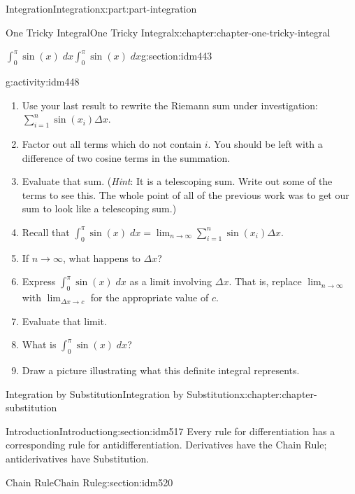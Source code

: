 \documentclass[oneside,10pt,]{book}
\numberwithin{equation}{section}
\begin{document}
\begin{partptx}{Integration}{}{Integration}{}{}{x:part:part-integration}
\begin{chapterptx}{One Tricky Integral}{}{One Tricky Integral}{}{}{x:chapter:chapter-one-tricky-integral}
\begin{sectionptx}{\(\displaystyle \int_0^\pi \sin(x) \; dx\)}{}{\(\displaystyle \int_0^\pi \sin(x) \; dx\)}{}{}{g:section:idm443}
\begin{activity}{}{g:activity:idm448}
\begin{enumerate}[font=\bfseries,label=(\alph*),ref=\alph*]
\item{}Use your last result to rewrite the Riemann sum under investigation: \(\displaystyle \sum_{i=1}^n \sin(x_i) \Delta x\).%
\item{}Factor out all terms which do not contain \(i\). You should be left with a difference of two cosine terms in the summation.%
\item{}Evaluate that sum. (\emph{Hint}: It is a telescoping sum. Write out some of the terms to see this. The whole point of all of the previous work was to get our sum to look like a telescoping sum.)%
\item{}Recall that \(\displaystyle \int_0^\pi \sin(x) \;dx = \lim_{n \to \infty} \sum_{i=1}^n \sin(x_i) \Delta x\).%
\item{}If \(n \to \infty\), what happens to \(\Delta x\)?%
\item{}Express \(\displaystyle \int_0^\pi \sin(x) \; dx\) as a limit involving \(\Delta x\). That is, replace \(\displaystyle \lim_{n \to \infty}\) with \(\displaystyle \lim_{\Delta x \to c}\) for the appropriate value of \(c\).%
\item{}Evaluate that limit.%
\item{}What is \(\displaystyle \int_0^\pi \sin(x) \; dx\)?%
\item{}Draw a picture illustrating what this definite integral represents.%
\end{enumerate}
\end{activity}
\end{sectionptx}
\end{chapterptx}
%
\typeout{************************************************}
\typeout{************************************************}
%
\begin{chapterptx}{Integration by Substitution}{}{Integration by Substitution}{}{}{x:chapter:chapter-substitution}
%
%
\typeout{************************************************}
\typeout{************************************************}
%
\begin{sectionptx}{Introduction}{}{Introduction}{}{}{g:section:idm517}
Every rule for differentiation has a corresponding rule for antidifferentiation. Derivatives have the Chain Rule; antiderivatives have Substitution.%
\end{sectionptx}
%
%
\typeout{************************************************}
\typeout{************************************************}
%
\begin{sectionptx}{Chain Rule}{}{Chain Rule}{}{}{g:section:idm520}

\end{sectionptx}
\end{chapterptx}
\end{partptx}
\end{document}
